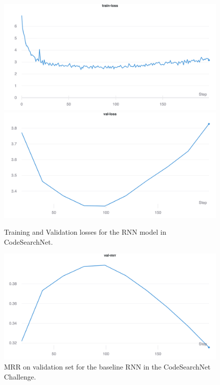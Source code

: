 \documentclass{article}
\begin{document}
\begin{figure}[!ht]
    \centering
    \includegraphics[scale=0.16]{figures/rnn/train-loss.png}
    \includegraphics[scale=0.16]{figures/rnn/val-loss.png}
    \caption{Training and Validation losses for the RNN model in CodeSearchNet.}
    \label{fig:train_valid_neural_rnn_model}
\end{figure}

\begin{figure}[!ht]
    \centering
    \includegraphics[scale=0.3]{figures/rnn/val-mrr.png}
    \caption{MRR on validation set for the baseline RNN in the CodeSearchNet Challenge.}
    \label{fig:val_mrr_rnn}
\end{figure}
\end{document}
